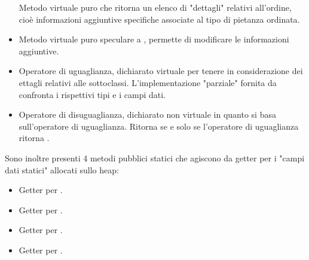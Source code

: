 \begin{itemize}
	Metodo virtuale puro che ritorna un elenco di "dettagli" relativi all'ordine, cioè informazioni aggiuntive specifiche associate al tipo di pietanza ordinata.
	\item {}\newline
	Metodo virtuale puro speculare a , permette di modificare le informazioni aggiuntive.
	\item {}\newline
	Operatore di uguaglianza, dichiarato virtuale per tenere in considerazione dei ettagli relativi alle sottoclassi. L'implementazione "parziale" fornita da  confronta i rispettivi tipi e i campi dati.
	\item {}\newline
	Operatore di disuguaglianza, dichiarato non virtuale in quanto si basa sull'operatore di uguaglianza. Ritorna  se e solo se l'operatore di uguaglianza ritorna .
\end{itemize}
Sono inoltre presenti 4 metodi pubblici statici che agiscono da getter per i "campi dati statici" allocati sullo heap:
\begin{itemize}
	\item {}\newline
	Getter per .
	\item {}\newline
	Getter per .
	\item {}\newline
	Getter per .
	\item {}\newline
	\newline
	Getter per .
\end{itemize}
